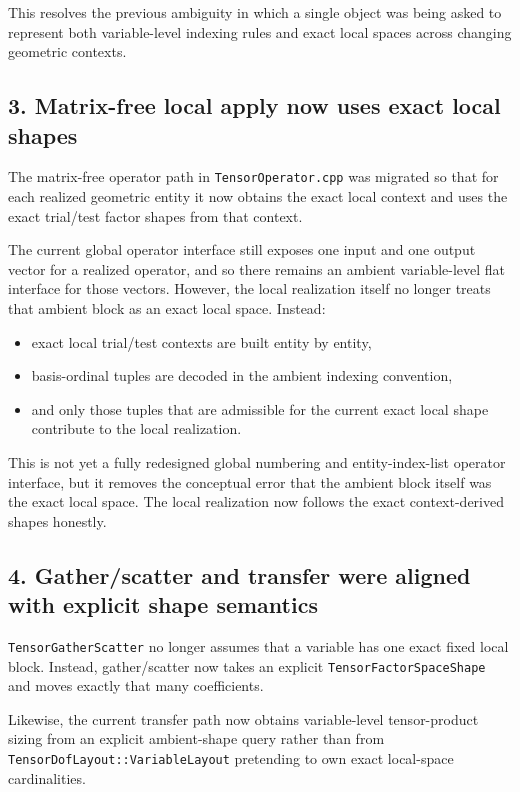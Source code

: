 \documentclass[11pt]{article}
\begin{document}
This resolves the previous ambiguity in which a single object was being asked to represent both variable-level indexing rules and exact local spaces across changing geometric contexts.

\subsection{3. Matrix-free local apply now uses exact local shapes}

The matrix-free operator path in \texttt{TensorOperator.cpp} was migrated so that for each realized geometric entity it now obtains the exact local context and uses the exact trial/test factor shapes from that context.

The current global operator interface still exposes one input and one output vector for a realized operator, and so there remains an ambient variable-level flat interface for those vectors.  However, the local realization itself no longer treats that ambient block as an exact local space.  Instead:
\begin{itemize}[leftmargin=*]
  \item exact local trial/test contexts are built entity by entity,
  \item basis-ordinal tuples are decoded in the ambient indexing convention,
  \item and only those tuples that are admissible for the current exact local shape contribute to the local realization.
\end{itemize}

This is not yet a fully redesigned global numbering and entity-index-list operator interface, but it removes the conceptual error that the ambient block itself was the exact local space.  The local realization now follows the exact context-derived shapes honestly.

\subsection{4. Gather/scatter and transfer were aligned with explicit shape semantics}

\texttt{TensorGatherScatter} no longer assumes that a variable has one exact fixed local block.  Instead, gather/scatter now takes an explicit \texttt{TensorFactorSpaceShape} and moves exactly that many coefficients.

Likewise, the current transfer path now obtains variable-level tensor-product sizing from an explicit ambient-shape query rather than from \texttt{TensorDofLayout::VariableLayout} pretending to own exact local-space cardinalities.
\end{document}
